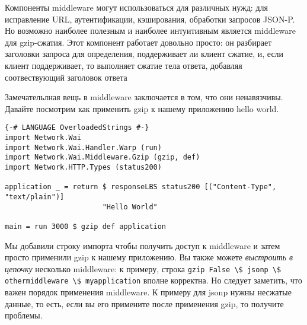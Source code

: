 Компоненты middleware могут использоваться для различных нужд: для исправление URL,
аутентификации, кэширования, обработки запросов JSON-P. Но возможно наиболее полезным
и наиболее интуитивным является middleware для gzip-сжатия. Этот компонент работает
довольно просто: он разбирает заголовки запроса для определения, поддерживает ли клиент
сжатие, и, если клиент поддерживает, то выполняет сжатие тела ответа, добавляя соотвествующий
заголовок ответа

Замечательлная вещь в middleware заключается в том, что они ненавязчивы. Давайте посмотрим
как применить gzip к нашему приложению hello world.

\begin{lstlisting}
{-# LANGUAGE OverloadedStrings #-}
import Network.Wai
import Network.Wai.Handler.Warp (run)
import Network.Wai.Middleware.Gzip (gzip, def)
import Network.HTTP.Types (status200)

application _ = return $ responseLBS status200 [("Content-Type", "text/plain")]
                       "Hello World"

main = run 3000 $ gzip def application
\end{lstlisting}%

Мы добавили строку импорта чтобы получить доступ к middleware и затем просто применили gzip
к нашему приложению. Вы также можете \emph{выстроить в цепочку} несколько middleware:
к примеру, строка \lstinline{gzip False \$ jsonp \$ othermiddleware \$ myapplication}
вполне корректна. Но следует заметить, что важен порядок применения middleware. К примеру
для jsonp нужны несжатые данные, то есть, если вы его примените после применения gzip,
то получите проблемы.

